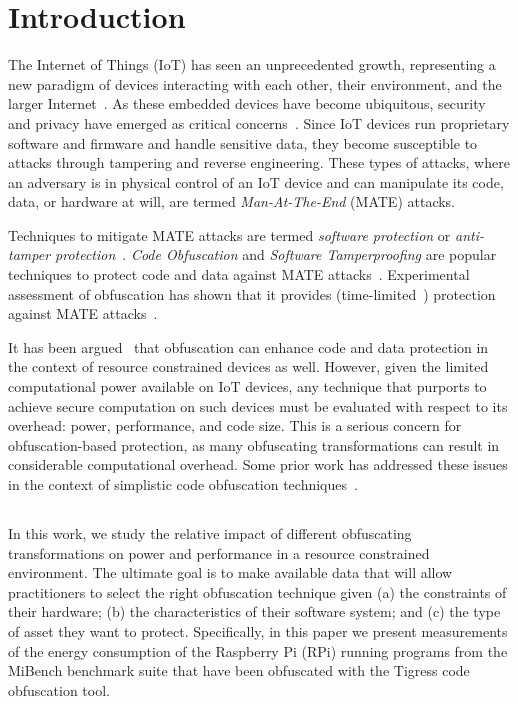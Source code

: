 \section{Introduction}
The Internet of Things (IoT) has seen an unprecedented growth, representing a new paradigm of devices interacting with each other, their environment, and the larger Internet~\cite{ATZORI20102787}. As these embedded devices have become ubiquitous, security and privacy have emerged as critical concerns~\cite{weber2010internet,7054433}. Since IoT devices run proprietary software and firmware and handle sensitive data, they become susceptible to attacks through tampering and reverse engineering. These types of attacks, where an adversary is in physical control of an IoT device and can manipulate its code, data, or hardware at will, are termed {\em Man-At-The-End} (MATE) attacks. 

Techniques to mitigate MATE attacks are termed {\em software protection} or {\em anti-tamper protection}~\cite{falcarin2011guest}. {\em Code Obfuscation} and {\em Software Tamperproofing} are popular techniques to protect code and data against MATE attacks~\cite{collberg_surreptitious_2010}. Experimental assessment of obfuscation has shown that it provides (time-limited~\cite{hohl98time}) protection against MATE attacks~\cite{5090041,7781792}.

It has been argued~\cite{Hosseinzadeh2015} that obfuscation can enhance code and data protection in the context of resource constrained devices as well. However, given the limited computational power available on IoT devices, any technique that purports to achieve secure computation on such devices must be evaluated with respect to its overhead: power, performance, and code size. This is a serious concern for obfuscation-based protection, as many obfuscating transformations can result in considerable computational overhead. Some prior work has addressed these issues in the context of simplistic code obfuscation techniques~\cite{6976079,dhukovic2015load,raj2017modelling}.
\subsection{}
In this work, we study the relative impact of different obfuscating transformations on power and performance in a resource constrained environment. The ultimate goal is to make available data that will allow practitioners to select the right obfuscation technique given (a) the constraints of their hardware; (b) the characteristics of their software system; and (c) the type of asset they want to protect. Specifically, in this paper we present measurements of the energy consumption of the Raspberry Pi (RPi) running programs from the MiBench benchmark suite that have been obfuscated with the Tigress code obfuscation tool. 

